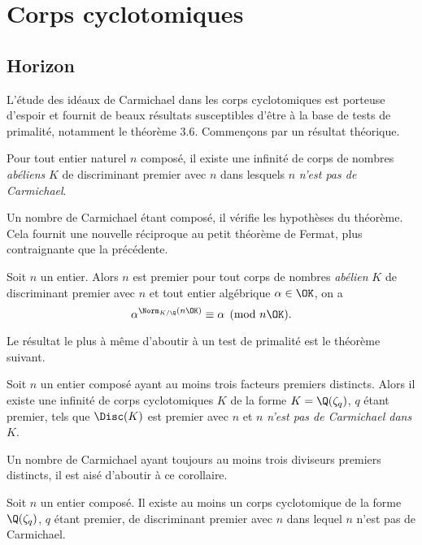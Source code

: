 \section{Corps cyclotomiques}

\subsection{Horizon}

L'étude des idéaux de Carmichael dans les corps cyclotomiques est porteuse d'espoir et fournit de beaux résultats susceptibles d'être à la base de tests de primalité, notamment le théorème 3.6. Commençons par un résultat théorique.

\begin{theoreme}
	Pour tout entier naturel $n$ composé, il existe une infinité de corps de nombres \emph{abéliens} $K$ de discriminant premier avec $n$ dans lesquels $n$ \emph{n'est pas de Carmichael}.
\end{theoreme}

Un nombre de Carmichael étant composé, il vérifie les hypothèses du théorème. Cela fournit une nouvelle réciproque au petit théorème de Fermat, plus contraignante que la précédente.

\begin{theoreme}
	Soit $n$ un entier. Alors $n$ est premier \ssi pour tout corps de nombres \emph{abélien} $K$ de discriminant premier avec $n$ et tout entier algébrique $\alpha \in \OK$, on a $$\alpha^{\Norm_{K/\Q}(n\OK)} \equiv \alpha \pmod{n\OK}.$$
\end{theoreme}

Le résultat le plus à même d'aboutir à un test de primalité est le théorème suivant.

\begin{theoreme}
	Soit $n$ un entier composé ayant au moins trois facteurs premiers distincts. Alors il existe une infinité de corps cyclotomiques $K$ de la forme $K = \Q(\zeta_q)$, $q$ étant premier, tels que $\Disc(K)$ est premier avec $n$ et $n$ \emph{n'est pas de Carmichael dans $K$}.
\end{theoreme}

Un nombre de Carmichael ayant toujours au moins trois diviseurs premiers distincts, il est aisé d'aboutir à ce corollaire.

\begin{corollaire}\label{corollaire-3.7}
	Soit $n$ un entier composé. Il existe au moins un corps cyclotomique de la forme $\Q(\zeta_q)$, $q$ étant premier, de discriminant premier avec $n$ dans lequel $n$ n'est pas de Carmichael.
\end{corollaire}

